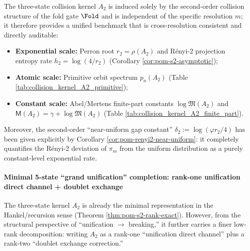 \begin{corollary}\label{cor:pom-a2-benchmark}
The three-state collision kernel \(A_2\) is induced solely by the second-order collision structure of the fold gate \(\Fold\) and is independent of the specific resolution \(m\); it therefore provides a unified benchmark that is cross-resolution consistent and directly auditable:
\begin{itemize}
  \item \textbf{Exponential scale:} Perron root \(r_2=\rho(A_2)\) and R\'enyi-2 projection entropy rate \(h_2=\log(4/r_2)\) (Corollary \ref{cor:pom-s2-asymptotic});
  \item \textbf{Atomic scale:} Primitive orbit spectrum \(p_n(A_2)\) (Table \ref{tab:collision_kernel_A2_primitive});
  \item \textbf{Constant scale:} Abel/Mertens finite-part constants \(\log\mathfrak{M}(A_2)\) and \(\mathsf{M}(A_2)=\gamma+\log\mathfrak{M}(A_2)\) (Table \ref{tab:collision_kernel_A2_finite_part}).
\end{itemize}
Moreover, the second-order ``near-uniform gap constant''
\(
\delta_2:=\log(\varphi r_2/4)
\)
has been given explicitly by Corollary \ref{cor:pom-renyi2-near-uniform}: it completely quantifies the R\'enyi-2 deviation of \(\pi_m\) from the uniform distribution as a purely constant-level exponential rate.
\end{corollary}

\paragraph{Minimal 5-state ``grand unification'' completion: rank-one unification direct channel + doublet exchange}
The three-state kernel \(A_2\) is already the minimal representation in the Hankel/recursion sense (Theorem \ref{thm:pom-s2-rank-exact}).
However, from the structural perspective of ``unification \(\to\) breaking,'' it further carries a finer low-rank decomposition: writing \(A_2\) as a rank-one ``unification direct channel'' plus a rank-two ``doublet exchange correction.''

